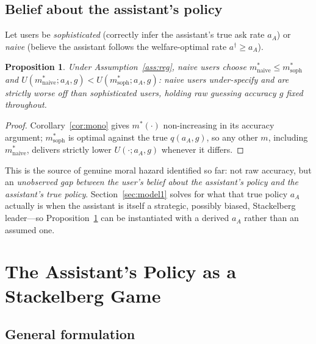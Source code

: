 \documentclass[11pt]{article}
\newtheorem{proposition}{Proposition}
\begin{document}
\subsection{Belief about the assistant's policy}
\label{sec:naive-soph}
Let users be \emph{sophisticated} (correctly infer the assistant's true ask rate
$a_A$) or \emph{naive} (believe the assistant follows the welfare-optimal rate
$a^\dagger \ge a_A$).

\begin{proposition}\label{prop:bias}
Under Assumption~\ref{ass:reg}, naive users choose
$m^*_{\text{naive}} \le m^*_{\text{soph}}$ and
$U(m^*_{\text{naive}};a_A,g) < U(m^*_{\text{soph}};a_A,g)$: naive users
under-specify and are strictly worse off than sophisticated users, holding raw
guessing accuracy $g$ fixed throughout.
\end{proposition}

\begin{proof}
Corollary~\ref{cor:mono} gives $m^*(\cdot)$ non-increasing in its accuracy
argument; $m^*_{\text{soph}}$ is optimal against the true $q(a_A,g)$, so any other
$m$, including $m^*_{\text{naive}}$, delivers strictly lower $U(\cdot;a_A,g)$
whenever it differs.
\end{proof}

This is the source of genuine moral hazard identified so far: not raw accuracy, but
an \emph{unobserved gap between the user's belief about the assistant's policy and
the assistant's true policy}. Section~\ref{sec:model1} solves for what that true
policy $a_A$ actually is when the assistant is itself a strategic, possibly biased,
Stackelberg leader---so Proposition~\ref{prop:bias} can be instantiated with a
derived $a_A$ rather than an assumed one.

\section{The Assistant's Policy as a Stackelberg Game}
\label{sec:stackelberg}

\subsection{General formulation}
\end{document}
